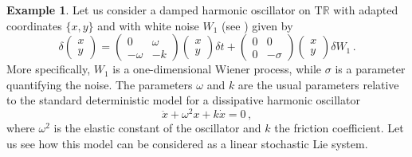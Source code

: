 \documentclass[11pt]{article}
\theoremstyle{plain}
\theoremstyle{definition}
\newtheorem{example}[theorem]{Example}
\newcommand{\T}{\mathrm{T}}
\begin{document}
\begin{example}\label{eq:WhiteOscil} Let us consider a damped harmonic oscillator on $\T \mathbb{R}$ with adapted coordinates $\{x,y\}$ and with white noise $W_1$ (see \cite{Ha19}) given by
\begin{equation}\label{eq:HOWN}
\delta\begin{pmatrix} x \\ y \end{pmatrix} = \begin{pmatrix} 0 & \omega \\ -\omega & -k \end{pmatrix}\begin{pmatrix} x \\ y \end{pmatrix}\delta t + \begin{pmatrix} 0 & 0 \\ 0 & -\sigma \end{pmatrix}\begin{pmatrix} x \\ y \end{pmatrix} \delta W_1\,.
\end{equation}
More specifically, $W_1$ is a one-dimensional Wiener process, while $\sigma$ is a parameter quantifying the noise. The parameters $\omega$ and $k$ are the usual parameters relative to the standard deterministic model for a dissipative harmonic oscillator
$$ \ddot x+\omega^2 x+k\dot x=0\,, $$
where $\omega^2$ is the elastic constant of the oscillator and $k$ the friction coefficient. Let us see how this model can be considered as a linear stochastic Lie system.


\end{example}
\end{document}

